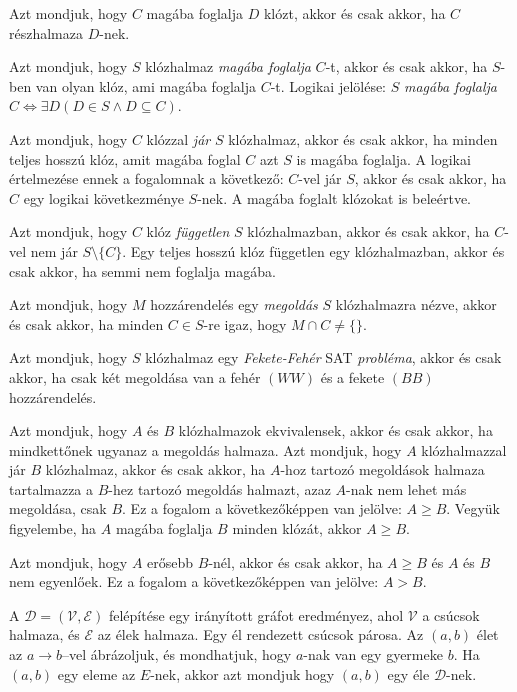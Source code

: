 \documentclass[
]{thesis-ekf}
\theoremstyle{definition}
\theoremstyle{remark}
\begin{document}
	Azt mondjuk, hogy $ C $ magába foglalja $ D $ klózt, akkor és csak akkor, ha $ C $ részhalmaza $ D $-nek.
	
	Azt mondjuk, hogy $ S $ klózhalmaz \emph{magába foglalja} $ C $-t, akkor és csak akkor, ha $ S $-ben van olyan klóz, ami magába foglalja $ C $-t. Logikai jelölése: $ S $ \emph{magába foglalja} $ C \Leftrightarrow\exists D(D\in S\wedge D\subseteq C) $.
	
	Azt mondjuk, hogy $ C $ klózzal \emph{jár} $ S $ klózhalmaz, akkor és csak akkor, ha minden teljes hosszú klóz, amit magába foglal $ C $ azt $ S $ is magába foglalja. A logikai értelmezése ennek a fogalomnak a következő: $ C $-vel jár $ S $, akkor és csak akkor, ha $ C $ egy logikai következménye $ S $-nek. A magába foglalt klózokat is beleértve.

	Azt mondjuk, hogy $ C $ klóz \emph{független} $ S $ klózhalmazban, akkor és csak akkor, ha $ C $-vel nem jár $ S\setminus\{C\} $. Egy teljes hosszú klóz független egy klózhalmazban, akkor és csak akkor, ha semmi nem foglalja magába.

	Azt mondjuk, hogy $ M $ hozzárendelés egy \emph{megoldás} $ S $ klózhalmazra nézve, akkor és csak akkor, ha minden $ C\in S $-re igaz, hogy $ M\cap C\ne \{\} $.

	Azt mondjuk, hogy $ S $ klózhalmaz egy \emph{Fekete-Fehér} \textsc{SAT} \emph{probléma}, akkor és csak akkor, ha csak két megoldása van a fehér $ (WW) $ és a fekete $ (BB) $ hozzárendelés.

	Azt mondjuk, hogy $ A $ és $ B $ klózhalmazok ekvivalensek, akkor és csak akkor, ha mindkettőnek ugyanaz a megoldás halmaza. Azt mondjuk, hogy $ A $ klózhalmazzal jár $ B $ klózhalmaz, akkor és csak akkor, ha $ A $-hoz tartozó megoldások halmaza tartalmazza a $ B $-hez tartozó megoldás halmazt, azaz $ A $-nak nem lehet más megoldása, csak $ B $. Ez a fogalom a következőképpen van jelölve: $ A\geq B $. Vegyük figyelembe, ha $ A $ magába foglalja $ B $ minden klózát, akkor $ A\geq B $.

	Azt mondjuk, hogy $ A $ erősebb $ B $-nél, akkor és csak akkor, ha $ A\geq B $ és $ A $ és $ B $ nem egyenlőek. Ez a fogalom a következőképpen van jelölve: $ A>B $.

	A $ \mathcal{D}=(\mathcal{V},\mathcal{E}) $ felépítése egy irányított gráfot eredményez, ahol $ \mathcal{V} $ a csúcsok halmaza, és $ \mathcal{E} $ az élek halmaza. Egy él rendezett csúcsok párosa. Az $ (a, b) $ élet az $ a\rightarrow b $–vel ábrázoljuk, és mondhatjuk, hogy $ a $-nak van egy gyermeke $ b $. Ha $ (a, b) $ egy eleme az $ E $-nek, akkor azt mondjuk hogy $ (a, b) $ egy éle $ \mathcal{D} $-nek.
	
\end{document}
